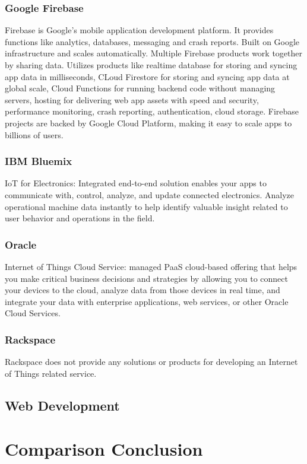 \subsubsection{Google Firebase}
Firebase is Google's mobile application development platform. It provides functions like analytics, databases, messaging and crash reports. Built on Google infrastructure and scales automatically. Multiple Firebase products work together by sharing data. Utilizes products like realtime database for storing and syncing app data in milliseconds, CLoud Firestore for storing and syncing app data at global scale, Cloud Functions for running backend code without managing servers, hosting for delivering web app assets with speed and security, performance monitoring, crash reporting, authentication, cloud storage. Firebase projects are backed by Google Cloud Platform, making it easy to scale apps to billions of users. 

\subsubsection{IBM Bluemix}
IoT for Electronics: Integrated end-to-end solution enables your apps to communicate with, control, analyze, and update connected electronics. Analyze operational machine data instantly to help identify valuable insight related to user behavior and operations in the field. 

\subsubsection{Oracle}
Internet of Things Cloud Service: managed PaaS cloud-based offering that helps you make critical business decisions and strategies by allowing you to connect your devices to the cloud, analyze data from those devices in real time, and integrate your data with enterprise applications, web services, or other Oracle Cloud Services.  

\subsubsection{Rackspace}
Rackspace does not provide any solutions or products for developing an Internet of Things related service. 


\subsection{Web Development}


\section{Comparison Conclusion}